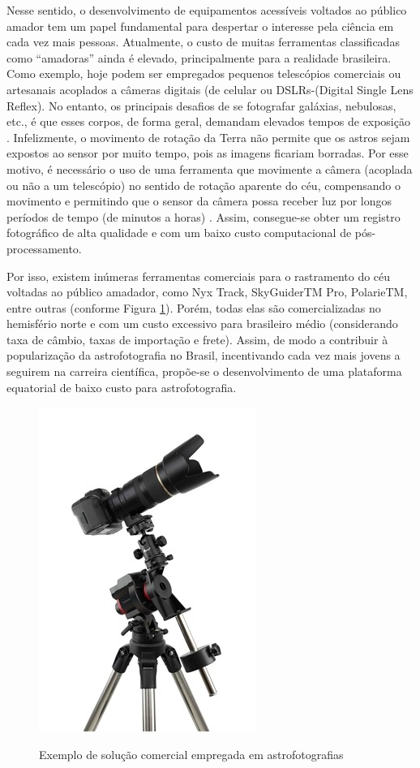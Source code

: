 Nesse sentido, o desenvolvimento de equipamentos acessíveis voltados ao público amador tem um papel fundamental para despertar o interesse pela ciência em cada vez mais pessoas. Atualmente, o custo de muitas ferramentas classificadas como “amadoras” ainda é elevado, principalmente para a realidade brasileira. Como exemplo, hoje podem ser empregados pequenos telescópios comerciais ou artesanais acoplados a câmeras digitais (de celular ou DSLRs-(Digital Single Lens Reflex). No entanto, os principais desafios de se fotografar galáxias, nebulosas, etc., é que esses corpos, de forma geral, demandam elevados tempos de exposição \cite{site:introCabau}. Infelizmente, o movimento de rotação da Terra não permite que os astros sejam expostos ao sensor por muito tempo, pois as imagens ficariam borradas. Por esse motivo, é necessário o uso de uma ferramenta que movimente a câmera (acoplada ou não a um telescópio) no sentido de rotação aparente do céu, compensando o movimento e permitindo que o sensor da câmera possa receber luz por longos períodos de tempo (de minutos a horas) \cite{site:introCabau}. Assim, consegue-se obter um registro fotográfico de alta qualidade e com um baixo custo computacional de pós-processamento.


Por isso, existem inúmeras ferramentas comerciais para o rastramento do céu voltadas ao público amadador, como Nyx Track, SkyGuiderTM Pro, PolarieTM, entre outras (conforme Figura \ref{fig:skyguider}). Porém, todas elas são comercializadas no hemisfério norte e com um custo excessivo para brasileiro médio (considerando taxa de câmbio, taxas de importação e frete). Assim, de modo a contribuir à popularização da astrofotografia no Brasil, incentivando cada vez mais jovens a seguirem na carreira científica, propõe-se o desenvolvimento de uma plataforma equatorial de baixo custo para astrofotografia.


\begin{figure}[htb]
	\centering
	\caption{Exemplo de solução comercial empregada em astrofotografias}
	\includegraphics[width=0.3\linewidth]{figuras/skyguider}
	\label{fig:skyguider}
\end{figure}
